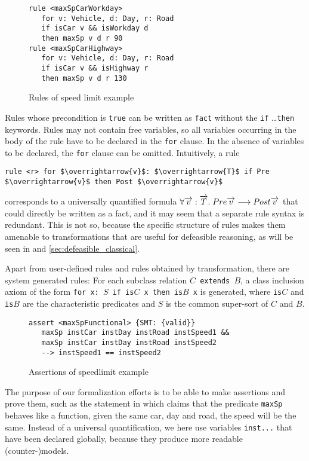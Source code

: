 \begin{figure}[h!]
  \begin{lstlisting}
rule <maxSpCarWorkday> 
   for v: Vehicle, d: Day, r: Road
   if isCar v && isWorkday d
   then maxSp v d r 90
rule <maxSpCarHighway>
   for v: Vehicle, d: Day, r: Road
   if isCar v && isHighway r
   then maxSp v d r 130
\end{lstlisting}
  \caption{Rules of speed limit example}\label{fig:rules}
\end{figure}

Rules whose precondition is \texttt{true} can be written as \texttt{fact}
without the \texttt{if} \dots \texttt{then} keywords.
Rules may not contain free variables, so all variables occurring in the body of
the rule have to be declared in the \texttt{for} clause. In the absence of
variables to be declared, the \texttt{for} clause can be omitted. 
Intuitively, a rule
\begin{lstlisting}[frame=none,mathescape=true]
  rule <r> for $\overrightarrow{v}$: $\overrightarrow{T}$ if Pre $\overrightarrow{v}$ then Post $\overrightarrow{v}$
\end{lstlisting}
corresponds to a universally quantified formula
$\forall \overrightarrow{v} : \overrightarrow{T}.\; Pre \overrightarrow{v}
\longrightarrow Post \overrightarrow{v}$ that could directly be written as a fact,
and it may seem that a separate rule syntax is redundant. This is not so,
because the specific structure of rules makes them amenable to transformations
that are useful for defeasible reasoning, as will be seen in
 and \ref{sec:defeasible_classical}.

Apart from user-defined rules and rules obtained by transformation, there are
system generated rules: For each subclass relation \texttt{$C$ extends $B$}, a
class inclusion axiom of the form \texttt{for x: $S$ if is$C$ x then is$B$ x}
is generated, where \texttt{is$C$} and \texttt{is$B$} are the characteristic
predicates and $S$ is the common super-sort of $C$ and $B$.

\begin{figure}[h]
\begin{lstlisting}
assert <maxSpFunctional> {SMT: {valid}}
   maxSp instCar instDay instRoad instSpeed1 &&
   maxSp instCar instDay instRoad instSpeed2
   --> instSpeed1 == instSpeed2
\end{lstlisting}
  \caption{Assertions of speedlimit example}\label{fig:assertions}
\end{figure}


The purpose of our formalization efforts is to be able to make assertions
and prove them, such as the statement in  which claims
that the predicate 
\texttt{maxSp} behaves like a function, \ie{} given the same car, day and
road, the speed will be the same. Instead of a universal quantification, we
here use variables \texttt{inst...} that have been declared globally, because they
produce more readable (counter-)models. 


